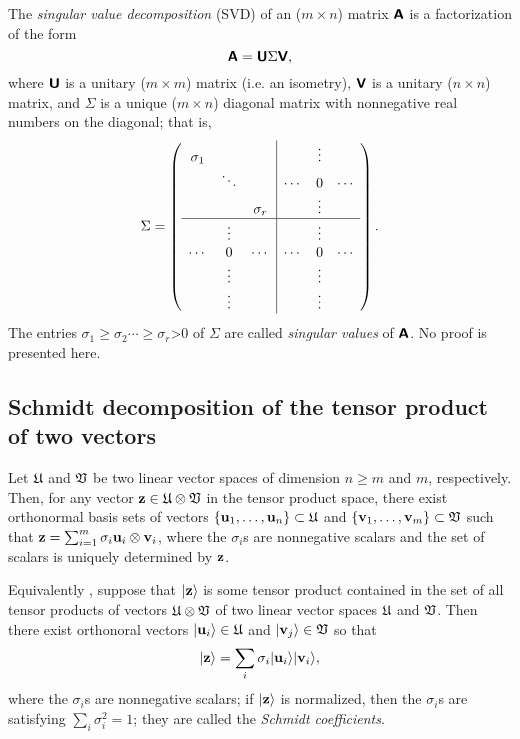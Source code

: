 The {\em singular value decomposition}
(SVD)
of an ($m\times n$)  matrix $\textsf{\textbf{A}}$ is a factorization of the form
\begin{equation}
\textsf{\textbf{A}} = \textsf{\textbf{U}} \Sigma \textsf{\textbf{V}} ,
\end{equation}
where
$\textsf{\textbf{U}}$ is a unitary ($m\times m$)  matrix (i.e. an isometry),
$\textsf{\textbf{V}}$ is a unitary ($n\times n$)  matrix,
and
$\Sigma$ is a unique ($m\times n$)   diagonal matrix with nonnegative real numbers on the diagonal;
that is,
\begin{equation}
\Sigma =
\left(
\begin{array}{ccc|ccc}
\sigma_1&&&&\vdots& \\
  &\ddots &&\cdots &0&\cdots \\
&&\sigma_r&&\vdots& \\
\hline
&\vdots&&&\vdots& \\
\cdots  &0&\cdots &\cdots &0&\cdots \\
&\vdots&&&\vdots& \\
&\vdots&&&\vdots& \\
\end{array}
\right).
\end{equation}
The entries $\sigma_1\ge \sigma_2 \cdots \ge \sigma_r$>0 of $\Sigma$ are called {\em singular values}
of $\textsf{\textbf{A}}$.  No proof is presented here.

\subsection{Schmidt decomposition of the tensor product of two vectors}
\label{2011-m-Schmidtdecomposition}

Let  ${\frak U}$  and   ${\frak V}$ be
two linear vector spaces
of dimension $n\ge m$ and $m$, respectively.
Then, for any vector
${\bf z} \in {\frak U}\otimes {\frak V}$
in the tensor product space,
there exist
orthonormal basis sets of vectors
$\{ {\bf u}_1, \ldots ,{\bf u}_n \}  \subset  {\frak U}$
and
$\{ {\bf v}_1, \ldots ,{\bf v}_m \}  \subset  {\frak V}$
such that
${\bf z}=\sum_{i=1}^m
\sigma_i  {\bf u}_i \otimes  {\bf v}_i$,
where the $\sigma_i$s are nonnegative scalars and the set of scalars is uniquely determined by
${\bf z}$.

Equivalently \cite{nielsen-book}, suppose that
$\vert {\bf z}\rangle $
 is some tensor product  contained in   the set of all tensor products of vectors
$ {\frak U}\otimes {\frak V}$ of     two linear vector spaces
 ${\frak U}$  and   ${\frak V}$.
Then there exist orthonoral vectors
$ \vert {\bf u}_i  \rangle \in  {\frak U}$
and
$ \vert {\bf v}_j  \rangle \in  {\frak V}$
so that
\begin{equation}
  \vert {\bf z}\rangle = \sum_i \sigma_i   \vert {\bf u}_i  \rangle  \vert {\bf v}_i  \rangle ,
\label{2011-e-sd}
\end{equation}
where the  $\sigma_i$s are nonnegative scalars; if $  \vert {\bf z}\rangle$
is normalized, then the  $\sigma_i$s are  satisfying
$\sum_i \sigma_i^2=1$;
they are called the
{\em Schmidt coefficients}.

